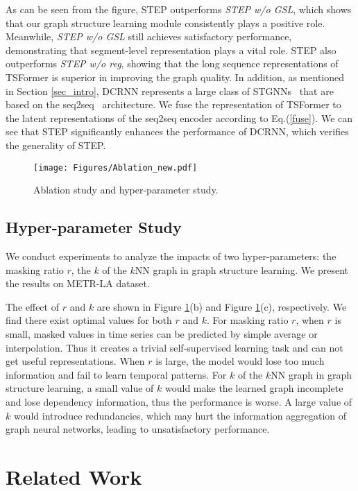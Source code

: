 \documentclass[sigconf]{acmart}
\begin{document}
As can be seen from the figure, STEP outperforms \textit{STEP w/o GSL}, which shows that our graph structure learning module consistently plays a positive role.
Meanwhile, \textit{STEP w/o GSL} still achieves satisfactory performance, demonstrating that segment-level representation plays a vital role.
STEP also outperforms \textit{STEP w/o reg}, showing that the long sequence representations of TSFormer is superior in improving the graph quality.
In addition, as mentioned in Section \ref{sec_intro}, DCRNN represents a large class of STGNNs~\cite{2019STMetaNet, 2021GTS, 2021REST, 2020GMAN} that are based on the seq2seq~\cite{2014Seq2Seq} architecture.
We fuse the representation of TSFormer to the latent representations of the seq2seq encoder according to Eq.(\ref{fuse}).
We can see that STEP significantly enhances the performance of DCRNN, which verifies the generality of STEP.

\begin{figure}
    \setlength{\abovecaptionskip}{0.0cm}
    \setlength{\belowcaptionskip}{-0.4cm}
  \centering
  \texttt{[image: Figures/Ablation\_new.pdf]}
  \caption{Ablation study and hyper-parameter study.}
  \label{ablation}
\end{figure}

\subsection{Hyper-parameter Study}
{\color{black}
We conduct experiments to analyze the impacts of two hyper-parameters: the masking ratio $r$, the $k$ of the $k$NN graph in graph structure learning. We present the results on METR-LA dataset.

The effect of $r$ and $k$ are shown in Figure \ref{ablation}(b) and Figure \ref{ablation}(c), respectively. We find there exist optimal values for both $r$ and $k$. 
For masking ratio $r$, when $r$ is small, masked values in time series can be predicted by simple average or interpolation. Thus it creates a trivial self-supervised learning task and can not get useful representations. 
When $r$ is large, the model would lose too much information and fail to learn temporal patterns. For $k$ of the $k$NN graph in graph structure learning, a small value of $k$ would make the learned graph incomplete and lose dependency information, thus the performance is worse. A large value of $k$ would introduce redundancies, which may hurt the information aggregation of graph neural networks, leading to unsatisfactory performance. } \section{Related Work}
\end{document}
